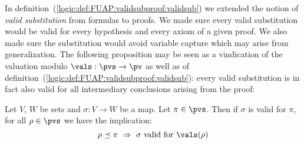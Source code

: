 In definition~(\ref{logic:def:FUAP:validsubproof:validsub}) we
extended the notion of {\em valid substitution} from formulas to
proofs. We made sure every valid substitution would be valid for
every hypothesis and every axiom of a given proof. We also made sure
the substitution would avoid variable capture which may arise from
generalization. The following proposition may be seen as a
vindication of the valuation modulo $\vals:\pvs\to\pv$ as well as of
definition~(\ref{logic:def:FUAP:validsubproof:validsub}): every
valid substitution is in fact also valid for all intermediary
conclusions arising from the proof:


\begin{prop}\label{logic:prop:FUAP:valuationmod:valid:vals}
Let $V$, $W$ be sets and $\sigma:V\to W$ be a map. Let $\pi\in\pvs$.
Then if $\sigma$ is valid for $\pi$, for all $\rho\in\pvs$ we have
the implication:
    \[
    \rho\preceq\pi\ \Rightarrow\ \mbox{$\sigma$ valid for $\vals(\rho)$}
    \]
\end{prop}
